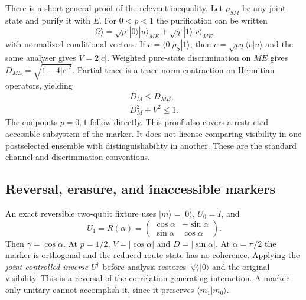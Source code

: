There is a short general proof of the relevant inequality. Let $\rho_{SM}$ be any joint state and purify it with $E$. For $0<p<1$ the purification can be written
\begin{equation}
 |\Omega\rangle=\sqrt p\,|0\rangle|u\rangle_{ME}
                 +\sqrt q\,|1\rangle|v\rangle_{ME},
\end{equation}
with normalized conditional vectors. If $c=\langle0|\rho_S|1\rangle$, then $c=\sqrt{pq}\langle v|u\rangle$ and the same analyser gives $V=2|c|$. Weighted pure-state discrimination on $ME$ gives
$D_{ME}=\sqrt{1-4|c|^2}$. Partial trace is a trace-norm contraction on Hermitian operators, yielding
\begin{equation}
\begin{gathered}
D_M\leq D_{ME},\\
 D_M^2+V^2\leq1.
\end{gathered}
\label{eq:mixed-duality}
\end{equation}
The endpoints $p=0,1$ follow directly. This proof also covers a restricted accessible subsystem of the marker. It does not license comparing visibility in one postselected ensemble with distinguishability in another. These are the standard channel and discrimination conventions.\cite{Watrous2018}

\subsection{Reversal, erasure, and inaccessible markers}
An exact reversible two-qubit fixture uses $|m\rangle=|0\rangle$,
$U_0=I$, and
\begin{equation}
 U_1=R(\alpha)=\begin{pmatrix}
 \cos\alpha&-\sin\alpha\\ \sin\alpha&\cos\alpha
 \end{pmatrix}.
\end{equation}
Then $\gamma=\cos\alpha$. At $p=1/2$, $V=|\cos\alpha|$ and $D=|\sin\alpha|$. At $\alpha=\pi/2$ the marker is orthogonal and the reduced route state has no coherence. Applying the \emph{joint controlled inverse} $U^\dagger$ before analysis restores $|\psi\rangle|0\rangle$ and the original visibility. This is a reversal of the correlation-generating interaction. A marker-only unitary cannot accomplish it, since it preserves $\langle m_1|m_0\rangle$.

